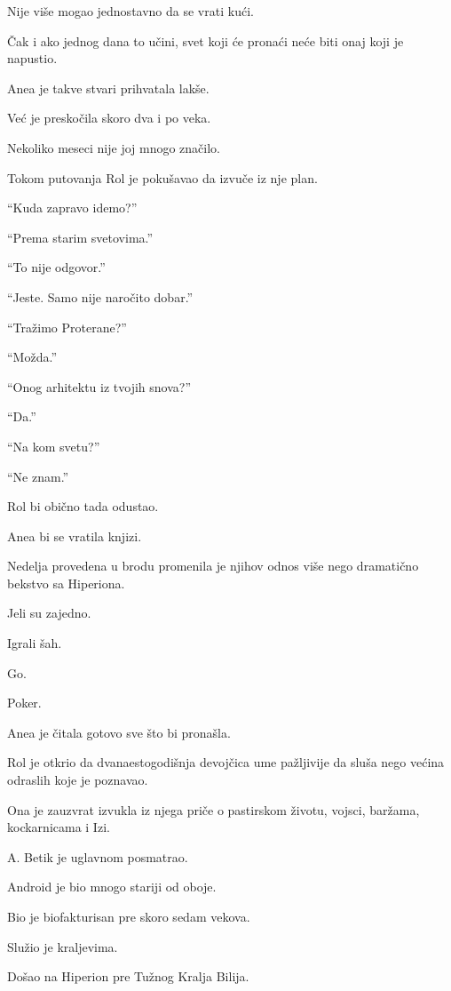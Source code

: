 Nije više mogao jednostavno da se vrati kući.

Čak i ako jednog dana to učini, svet koji će pronaći neće biti onaj koji je napustio.

\bigskip

Anea je takve stvari prihvatala lakše.

Već je preskočila skoro dva i po veka.

Nekoliko meseci nije joj mnogo značilo.

\bigskip

Tokom putovanja Rol je pokušavao da izvuče iz nje plan.

``Kuda zapravo idemo?''

``Prema starim svetovima.''

``To nije odgovor.''

``Jeste. Samo nije naročito dobar.''

``Tražimo Proterane?''

``Možda.''

``Onog arhitektu iz tvojih snova?''

``Da.''

``Na kom svetu?''

``Ne znam.''

Rol bi obično tada odustao.

Anea bi se vratila knjizi.

\bigskip

Nedelja provedena u brodu promenila je njihov odnos više nego dramatično bekstvo sa Hiperiona.

Jeli su zajedno.

Igrali šah.

Go.

Poker.

Anea je čitala gotovo sve što bi pronašla.

Rol je otkrio da dvanaestogodišnja devojčica ume pažljivije da sluša nego većina odraslih koje je poznavao.

Ona je zauzvrat izvukla iz njega priče o pastirskom životu, vojsci, baržama, kockarnicama i Izi.

\bigskip

A. Betik je uglavnom posmatrao.

Android je bio mnogo stariji od oboje.

Bio je biofakturisan pre skoro sedam vekova.

Služio je kraljevima.

Došao na Hiperion pre Tužnog Kralja Bilija.

